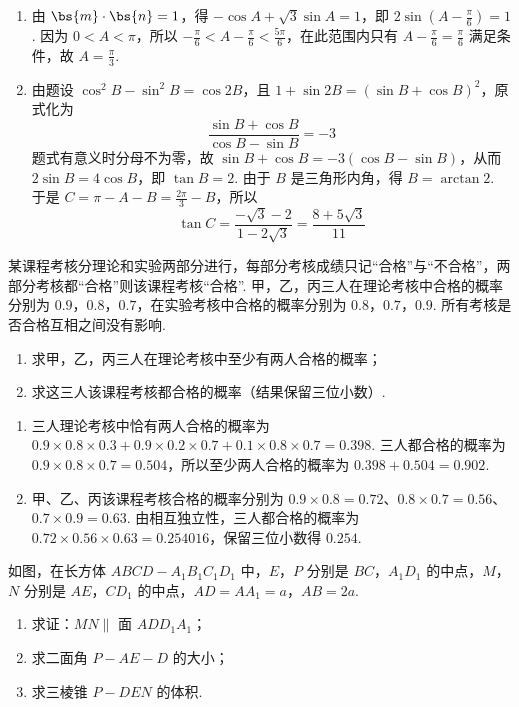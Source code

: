 \begin{solution}
\begin{enumerate}
\item 由 \(\bs{m}\cdot\bs{n}=1\)，得 \(-\cos A+\sqrt3\sin A=1\)，即 \(2\sin\left(A-\frac{\pi}{6}\right)=1\). 因为 \(0<A<\pi\)，所以 \(-\frac{\pi}{6}<A-\frac{\pi}{6}<\frac{5\pi}{6}\)，在此范围内只有 \(A-\frac{\pi}{6}=\frac{\pi}{6}\) 满足条件，故 \(A=\frac{\pi}{3}\).
\item 由题设 \(\cos^2B-\sin^2B=\cos2B\)，且 \(1+\sin2B=(\sin B+\cos B)^2\)，原式化为
\[
\frac{\sin B+\cos B}{\cos B-\sin B}=-3
\]
题式有意义时分母不为零，故 \(\sin B+\cos B=-3(\cos B-\sin B)\)，从而 \(2\sin B=4\cos B\)，即 \(\tan B=2\). 由于 \(B\) 是三角形内角，得 \(B=\arctan2\). 于是 \(C=\pi-A-B=\frac{2\pi}{3}-B\)，所以
\[
\tan C=\frac{-\sqrt3-2}{1-2\sqrt3}=\frac{8+5\sqrt3}{11}
\]
\end{enumerate}
\end{solution}

\begin{problem}
某课程考核分理论和实验两部分进行，每部分考核成绩只记“合格”与“不合格”，两部分考核都“合格”则该课程考核“合格”. 甲，乙，丙三人在理论考核中合格的概率分别为 \(0.9\)，\(0.8\)，\(0.7\)，在实验考核中合格的概率分别为 \(0.8\)，\(0.7\)，\(0.9\). 所有考核是否合格互相之间没有影响.

\begin{enumerate}
\item 求甲，乙，丙三人在理论考核中至少有两人合格的概率；
\item 求这三人该课程考核都合格的概率（结果保留三位小数）.
\end{enumerate}
\end{problem}

\begin{solution}
\begin{enumerate}
\item 三人理论考核中恰有两人合格的概率为 \(0.9\times0.8\times0.3+0.9\times0.2\times0.7+0.1\times0.8\times0.7=0.398\). 三人都合格的概率为 \(0.9\times0.8\times0.7=0.504\)，所以至少两人合格的概率为 \(0.398+0.504=0.902\).
\item 甲、乙、丙该课程考核合格的概率分别为 \(0.9\times0.8=0.72\)、\(0.8\times0.7=0.56\)、\(0.7\times0.9=0.63\). 由相互独立性，三人都合格的概率为 \(0.72\times0.56\times0.63=0.254016\)，保留三位小数得 \(0.254\).
\end{enumerate}
\end{solution}

\begin{problem}
如图，在长方体 \(ABCD-A_{1}B_{1}C_{1}D_{1}\) 中，\(E\)，\(P\) 分别是 \(BC\)，\(A_{1}D_{1}\) 的中点，\(M\)，\(N\) 分别是 \(AE\)，\(CD_{1}\) 的中点，\(AD=AA_{1}=a\)，\(AB=2a\).

\begin{enumerate}
\item 求证：\(MN\parallel\) 面 \(ADD_{1}A_{1}\)；
\item 求二面角 \(P-AE-D\) 的大小；
\item 求三棱锥 \(P-DEN\) 的体积.
\end{enumerate}

\end{problem}

